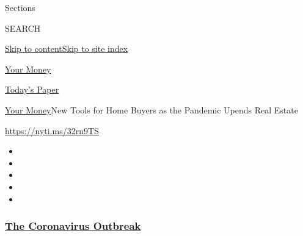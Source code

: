 Sections

SEARCH

\protect\hyperlink{site-content}{Skip to
content}\protect\hyperlink{site-index}{Skip to site index}

\href{https://www.nytimes3xbfgragh.onion/section/your-money}{Your Money}

\href{https://myaccount.nytimes3xbfgragh.onion/auth/login?response_type=cookie\&client_id=vi}{}

\href{https://www.nytimes3xbfgragh.onion/section/todayspaper}{Today's
Paper}

\href{/section/your-money}{Your Money}\textbar{}New Tools for Home
Buyers as the Pandemic Upends Real Estate

\url{https://nyti.ms/32rn9TS}

\begin{itemize}
\item
\item
\item
\item
\item
\end{itemize}

\hypertarget{the-coronavirus-outbreak}{%
\subsubsection{\texorpdfstring{\href{https://www.nytimes3xbfgragh.onion/news-event/coronavirus?name=styln-coronavirus-national\&region=TOP_BANNER\&variant=undefined\&block=storyline_menu_recirc\&action=click\&pgtype=Article\&impression_id=d788be40-e385-11ea-9f3a-f5bd08dc668f}{The
Coronavirus
Outbreak}}{The Coronavirus Outbreak}}\label{the-coronavirus-outbreak}}


